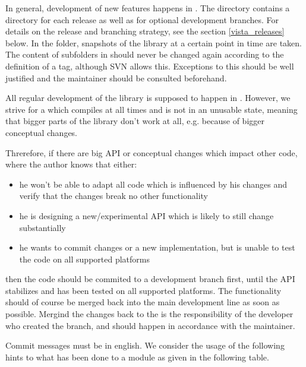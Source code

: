 In general, development of new features happens in .
The  directory contains a directory for each  release as well as for optional development branches. 
For details on the release and branching strategy, see the section \ref{vista_releases} below.
In the  folder, snapshots of the library at a certain point in time are taken.
The content of subfolders in  should never be changed again according to the definition of a tag, although SVN allows this.
Exceptions to this should be well justified and the maintainer should be consulted beforehand.

All regular development of the library is supposed to happen in .
However, we strive for a  which compiles at all times and is not in an unusable state, meaning that bigger parts of the library don't work at all, e.g. because of bigger conceptual changes.

Threrefore, if there are big API or conceptual changes which impact other code, where the author knows that either:

\begin{itemize}
\item he won't be able to adapt all code which is influenced by his changes and verify that the changes break no other functionality
\item he is designing a new/experimental API which is likely to still change substantially
\item he wants to commit changes or a new implementation, but is unable to test the code on all supported platforms
\end{itemize}

then the code should be commited to a development branch first, until the API stabilizes and has been tested on all supported platforms.
The functionality should of course be merged back into the main development line as soon as possible.
Mergind the changes back to the  is the responsibility of the developer who created the branch, and should happen in accordance with the  maintainer.

Commit messages must be in english.
We consider the usage of the following hints to what has been done to a module as given in the following table.

